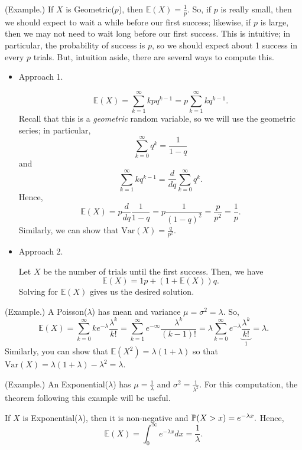\documentclass[letterpaper]{article}
\begin{document}
\begin{mdframed}[]
    (Example.) If $X$ is Geometric($p$), then $\mathbb{E}(X) = \frac{1}{p}$. So, if $p$ is really small, then we should expect to wait a while before our first success; likewise, if $p$ is large, then we may not need to wait long before our first success. This is intuitive; in particular, the probability of success is $p$, so we should expect about 1 success in every $p$ trials. But, intuition aside, there are several ways to compute this.
    \begin{itemize}
        \item Approach 1.
        \begin{mdframed}[]
            \[\mathbb{E}(X) = \sum_{k = 1}^{\infty} kpq^{k - 1} = p\sum_{k = 1}^{\infty} kq^{k - 1}.\]
            Recall that this is a \emph{geometric} random variable, so we will use the geometric series; in particular, 
            \[\sum_{k = 0}^{\infty} q^k = \frac{1}{1 - q}\]
            and 
            \[\sum_{k = 1}^{\infty} kq^{k - 1} = \frac{d}{dq} \sum_{k = 0}^{\infty} q^k.\]
            Hence,
            \[\mathbb{E}(X) = p \frac{d}{dq} \frac{1}{1 - q} = p\frac{1}{(1 - q)^2} = \frac{p}{p^2} = \frac{1}{p}.\] 
            Similarly, we can show that $\text{Var}(X) = \frac{q}{p^2}$. 
        \end{mdframed}

        \item Approach 2. 
        \begin{mdframed}[]
            Let $X$ be the number of trials until the first success. Then, we have 
            \[\mathbb{E}(X) = 1p + (1 + \mathbb{E}(X))q.\]
            Solving for $\mathbb{E}(X)$ gives us the desired solution.
        \end{mdframed}
    \end{itemize}
\end{mdframed}

\begin{mdframed}[]
    (Example.) A Poisson($\lambda$) has mean and variance $\mu = \sigma^2 = \lambda$. So, 
    \[\mathbb{E}(X) = \sum_{k = 0}^{\infty} ke^{-\lambda} \frac{\lambda^k}{k!} = \sum_{k = 1}^{\infty} e^{-\infty} \frac{\lambda^k}{(k - 1)!} = \lambda \sum_{k = 0}^{\infty} e^{-\lambda} \underbrace{\frac{\lambda^k}{k!}}_{1} = \lambda.\]
    Similarly, you can show that $\mathbb{E}(X^2) = \lambda(1 + \lambda)$ so that $\text{Var}(X) = \lambda(1 + \lambda) - \lambda^2 = \lambda$. 
\end{mdframed}

\begin{mdframed}[]
    (Example.) An Exponential($\lambda$) has $\mu = \frac{1}{\lambda}$ and $\sigma^2 = \frac{1}{\lambda^2}$. For this computation, the theorem following this example will be useful. 

    \bigskip 
    
    If $X$ is Exponential($\lambda$), then it is non-negative and $\mathbb{P}(X > x) = e^{-\lambda x}.$ Hence, 
    \[\mathbb{E}(X) = \int_{0}^{\infty} e^{-\lambda x} dx = \frac{1}{\lambda}.\]
\end{mdframed}
\end{document}
